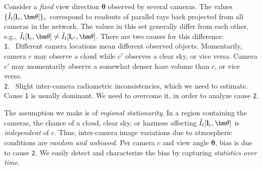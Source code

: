 \documentclass[runningheads]{llncs}
\begin{document}
Consider a {\em fixed} view direction ${\bm \theta}$ observed by several cameras.
The values $\{\tilde I_t[{\bf l}_c,{\bm \theta}]\}_c$ correspond to readouts of parallel rays back projected from all cameras in the network. The values in this set generally differ from each other, e.g.,
 $\tilde I_t[{\bf l}_c,{\bm \theta}]\neq \tilde I_t[{\bf l}_{c'},{\bm \theta}]$. There are two causes for this difference:\\
 {\tt 1}.~ Different camera locations mean different observed objects. Momentarily, camera $c$ may observe a cloud while $c'$ observes a clear sky, or vice versa. Camera $c'$ may momentarily observe a somewhat denser haze volume than $c$, or vice versa. \\
 {\tt 2}.~ Slight inter-camera radiometric inconsistencies, which we need to estimate.\\
 Cause {\tt 1} is usually dominant. We need to overcome it, in order to analyze cause {\tt 2}.

The assumption we make is of {\em regional stationarity}. In a region containing the cameras, the chance of a cloud, clear sky, or haziness affecting $\tilde I_t[{\bf l}_c,{\bm \theta}]$ is {\em independent} of $c$. Thus, inter-camera image variations due to atmospheric conditions are {\em random and unbiased}. Per camera $c$ and view angle ${\bm \theta}$, bias is due to cause {\tt 2}. We easily detect and characterize the bias by capturing {\em statistics over time}.
\end{document}
